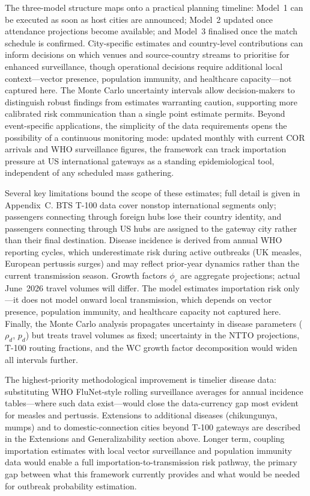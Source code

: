 \documentclass[12pt]{article}
\begin{document}
The three-model structure maps onto a practical planning timeline:
Model~1 can be executed as soon as host cities are announced;
Model~2 updated once attendance projections become available; and
Model~3 finalised once the match schedule is confirmed. City-specific
estimates and country-level contributions can inform decisions on which
venues and source-country streams to prioritise for enhanced
surveillance, though operational decisions require additional local
context---vector presence, population immunity, and healthcare
capacity---not captured here. The Monte Carlo uncertainty intervals
allow decision-makers to distinguish robust findings from estimates
warranting caution, supporting more calibrated risk communication than
a single point estimate permits. Beyond event-specific applications,
the simplicity of the data requirements opens the possibility of a
continuous monitoring mode: updated monthly with current COR arrivals
and WHO surveillance figures, the framework can track importation
pressure at US international gateways as a standing epidemiological
tool, independent of any scheduled mass gathering.

Several key limitations bound the scope of these estimates; full detail is given in Appendix~C. BTS T-100 data cover nonstop international segments only; passengers connecting through foreign hubs lose their country identity, and passengers connecting through US hubs are assigned to the gateway city rather than their final destination. Disease incidence is derived from annual WHO reporting cycles, which underestimate risk during active outbreaks (UK measles, European pertussis surges) and may reflect prior-year dynamics rather than the current transmission season. Growth factors $\phi_c$ are aggregate projections; actual June~2026 travel volumes will differ. The model estimates importation risk only---it does not model onward local transmission, which depends on vector presence, population immunity, and healthcare capacity not captured here. Finally, the Monte Carlo analysis propagates uncertainty in disease parameters ($\rho_d$, $p_d$) but treats travel volumes as fixed; uncertainty in the NTTO projections, T-100 routing fractions, and the WC growth factor decomposition would widen all intervals further.

The highest-priority methodological improvement is timelier disease data: substituting WHO FluNet-style rolling surveillance averages for annual incidence tables---where such data exist---would close the data-currency gap most evident for measles and pertussis. Extensions to additional diseases (chikungunya, mumps) and to domestic-connection cities beyond T-100 gateways are described in the Extensions and Generalizability section above. Longer term, coupling importation estimates with local vector surveillance and population immunity data would enable a full importation-to-transmission risk pathway, the primary gap between what this framework currently provides and what would be needed for outbreak probability estimation.
\end{document}
